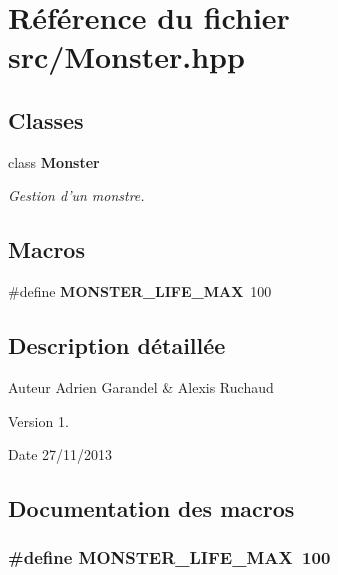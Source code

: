 \section{Référence du fichier src/\-Monster.hpp}
\label{_monster_8hpp}
\subsection*{Classes}
\begin{DoxyCompactItemize}
\item 
class {\bf Monster}
\begin{DoxyCompactList}\small\item\em Gestion d'un monstre. \end{DoxyCompactList}\end{DoxyCompactItemize}
\subsection*{Macros}
\begin{DoxyCompactItemize}
\item 
\#define {\bf M\-O\-N\-S\-T\-E\-R\-\_\-\-L\-I\-F\-E\-\_\-\-M\-A\-X}~100
\end{DoxyCompactItemize}


\subsection{Description détaillée}
\begin{DoxyAuthor}{Auteur}
Adrien Garandel \& Alexis Ruchaud 
\end{DoxyAuthor}
\begin{DoxyVersion}{Version}
1. 
\end{DoxyVersion}
\begin{DoxyDate}{Date}
27/11/2013 
\end{DoxyDate}


\subsection{Documentation des macros}
\subsubsection[{M\-O\-N\-S\-T\-E\-R\-\_\-\-L\-I\-F\-E\-\_\-\-M\-A\-X}]{\setlength{\rightskip}{0pt plus 5cm}\#define M\-O\-N\-S\-T\-E\-R\-\_\-\-L\-I\-F\-E\-\_\-\-M\-A\-X~100}\label{_monster_8hpp_a3e7c38d0ba27447b95e04b715793bce7}

